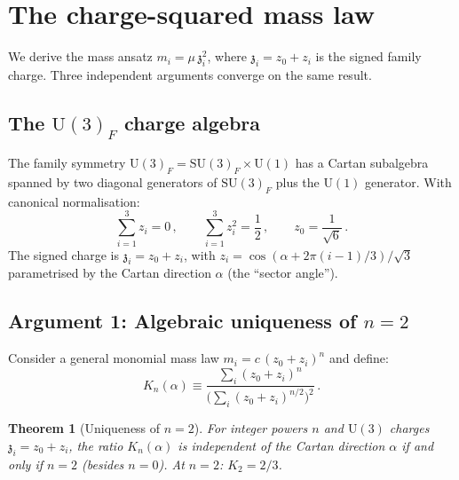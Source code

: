 \documentclass[12pt,a4paper]{article}
\newtheorem{theorem}{Theorem}
\newcommand{\SU}{\mathrm{SU}}
\newcommand{\UU}{\mathrm{U}}
\newcommand{\zch}{\mathfrak{z}}
\begin{document}
\section{The charge-squared mass law}
\label{sec:charges}

We derive the mass ansatz $m_i = \mu\,\zch_i^2$, where
$\zch_i = z_0 + z_i$ is the signed family charge.
Three independent arguments converge on the same result.

\subsection{The $\UU(3)_F$ charge algebra}

The family symmetry $\UU(3)_F = \SU(3)_F \times \UU(1)$ has a
Cartan subalgebra spanned by two diagonal generators of
$\SU(3)_F$ plus the $\UU(1)$ generator.
With canonical normalisation:
\begin{equation}
  \sum_{i=1}^{3} z_i = 0\,,\qquad
  \sum_{i=1}^{3} z_i^2 = \frac{1}{2}\,,\qquad
  z_0 = \frac{1}{\sqrt{6}}\,.
\end{equation}
The signed charge is $\zch_i = z_0 + z_i$, with
$z_i = \cos(\alpha + 2\pi(i-1)/3)/\sqrt{3}$ parametrised by
the Cartan direction $\alpha$ (the ``sector angle'').


\subsection{Argument 1: Algebraic uniqueness of $n = 2$}
\label{sec:uniqueness_n2}

Consider a general monomial mass law $m_i = c\,(z_0 + z_i)^n$
and define:
\begin{equation}
  K_n(\alpha) \equiv
  \frac{\sum_i (z_0{+}z_i)^n}
  {\bigl(\sum_i (z_0{+}z_i)^{n/2}\bigr)^2}\,.
  \label{eq:Kn}
\end{equation}

\begin{theorem}[Uniqueness of $n = 2$]
\label{thm:n2}
For integer powers $n$ and $\UU(3)$ charges $\zch_i = z_0 + z_i$,
the ratio $K_n(\alpha)$ is independent of the Cartan direction
$\alpha$ if and only if $n = 2$ (besides $n = 0$).
At $n = 2$: $K_2 = 2/3$.
\end{theorem}
\end{document}
